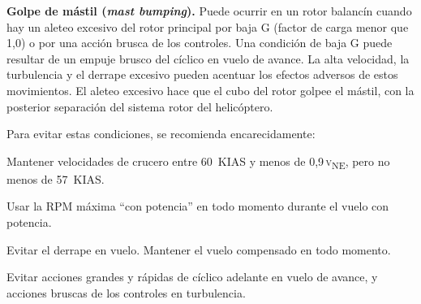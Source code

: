\textbf{Golpe de mástil (\emph{mast bumping}).} Puede ocurrir en un rotor balancín cuando hay un aleteo excesivo del rotor principal por baja G (factor de carga menor que 1,0) o por una acción brusca de los controles. Una condición de baja G puede resultar de un empuje brusco del cíclico en vuelo de avance. La alta velocidad, la turbulencia y el derrape excesivo pueden acentuar los efectos adversos de estos movimientos. El aleteo excesivo hace que el cubo del rotor golpee el mástil, con la posterior separación del sistema rotor del helicóptero.

Para evitar estas condiciones, se recomienda encarecidamente:

\begin{pasos}
\item Mantener velocidades de crucero entre 60~KIAS y menos de 0,9\,\textsc{v}\textsubscript{NE}, pero no menos de 57~KIAS.
\item Usar la RPM máxima ``con potencia'' en todo momento durante el vuelo con potencia.
\item Evitar el derrape en vuelo. Mantener el vuelo compensado en todo momento.
\item Evitar acciones grandes y rápidas de cíclico adelante en vuelo de avance, y acciones bruscas de los controles en turbulencia.
\end{pasos}
